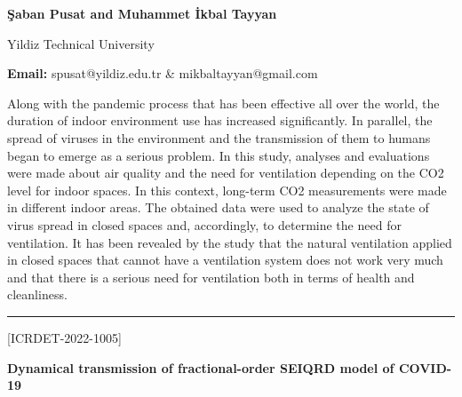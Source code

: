 \documentclass[twoside,11pt]{amsart}
\begin{document}
\centerline{\textbf{Şaban Pusat and Muhammet \.{I}kbal Tayyan }}
\vskip 5mm
\begin{flushleft}
Yildiz Technical University
\vskip 5mm
\end{flushleft}
\vskip 2mm
\begin{flushleft}
{\bf Email:} spusat@yildiz.edu.tr \& mikbaltayyan@gmail.com
\end{flushleft}
\vskip 10mm
Along with the pandemic process that has been effective all over the world, the duration of indoor environment use has increased significantly. In parallel, the spread of viruses in the environment and the transmission of them to humans began to emerge as a serious problem. In this study, analyses and evaluations were made about air quality and the need for ventilation depending on the CO2 level for indoor spaces. In this context, long-term CO2 measurements were made in different indoor areas. The obtained data were used to analyze the state of virus spread in closed spaces and, accordingly, to determine the need for ventilation. It has been revealed by the study that the natural ventilation applied in closed spaces that cannot have a ventilation system does not work very much and that there is a serious need for ventilation both in terms of health and cleanliness.
\vskip 5mm
\rule{\textwidth}{0.5pt}
\vskip 5mm
\begin{flushleft}
\centerline{[ICRDET-2022-1005]}
\end{flushleft}
\begin{center}\bf\LARGE
Dynamical transmission of fractional-order SEIQRD model of COVID-19
\end{center}
\vskip 5mm
\end{document}

